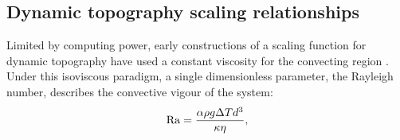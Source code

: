 \subsection{Dynamic topography scaling relationships}\label{sec:intro-scaling}

Limited by computing power, early constructions of a scaling function for dynamic topography have used a constant viscosity for the convecting region \citep{parsons_relationship_1983, kiefer_geoid_1992}. Under this isoviscous paradigm, a single dimensionless parameter, the Rayleigh number, describes the convective vigour of the system:
\begin{equation}\label{eq:Ra}
    {\rm Ra} = \frac{\alpha\rho g \Delta T d^3}{\kappa \eta},
\end{equation}
